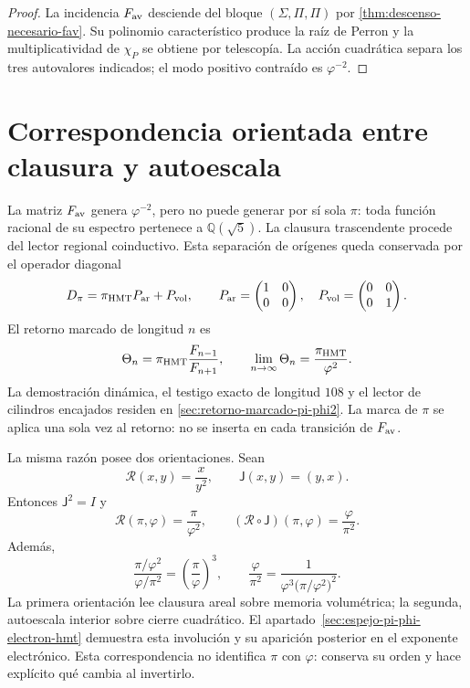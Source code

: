 \begin{proof}
La incidencia \(F_{\rm av}\) desciende del bloque
\((\Sigma,\Pi,\Pi)\) por
\cref{thm:descenso-necesario-fav}. Su polinomio característico produce la
raíz de Perron y la multiplicatividad de \(\chi_P\) se obtiene por
telescopía. La acción cuadrática separa los tres autovalores indicados; el
modo positivo contraído es \(\varphi^{-2}\).
\end{proof}

\section{Correspondencia orientada entre clausura y autoescala}

La matriz \(F_{\rm av}\) genera \(\varphi^{-2}\), pero no puede generar por
sí sola \(\pi\): toda función racional de su espectro pertenece a
\(\mathbb Q(\sqrt5)\). La clausura trascendente procede del lector regional
coinductivo. Esta separación de orígenes queda conservada por el operador
diagonal
\[
 D_\pi=\pi_{\rm HMT}P_{\rm ar}+P_{\rm vol},
\qquad
 P_{\rm ar}=
 \begin{pmatrix}1&0\\0&0\end{pmatrix},
\quad
 P_{\rm vol}=
 \begin{pmatrix}0&0\\0&1\end{pmatrix}.
\]
El retorno marcado de longitud \(n\) es
\[
\Theta_n
=\pi_{\rm HMT}\frac{F_{n-1}}{F_{n+1}},
\qquad
\lim_{n\to\infty}\Theta_n
=\frac{\pi_{\rm HMT}}{\varphi^2}.
\]
La demostración dinámica, el testigo exacto de longitud \(108\) y el lector
de cilindros encajados residen en
\cref{sec:retorno-marcado-pi-phi2}. La marca de \(\pi\) se aplica una sola
vez al retorno: no se inserta en cada transición de \(F_{\rm av}\).

La misma razón posee dos orientaciones. Sean
\[
\mathscr R(x,y)=\frac{x}{y^2},
\qquad
\mathsf J(x,y)=(y,x).
\]
Entonces \(\mathsf J^2=I\) y
\[
\boxed{
\mathscr R(\pi,\varphi)=\frac{\pi}{\varphi^2},
\qquad
(\mathscr R\circ\mathsf J)(\pi,\varphi)
=\frac{\varphi}{\pi^2}.}
\]
Además,
\[
\frac{\pi/\varphi^2}{\varphi/\pi^2}
={\left(\frac{\pi}{\varphi}\right)}^3,
\qquad
\frac{\varphi}{\pi^2}
=\frac{1}{\varphi^3{\bigl(\pi/\varphi^2\bigr)}^2}.
\]
La primera orientación lee clausura areal sobre memoria volumétrica; la
segunda, autoescala interior sobre cierre cuadrático. El
apartado~\ref{sec:espejo-pi-phi-electron-hmt} demuestra esta involución y su
aparición posterior en el exponente electrónico. Esta correspondencia no identifica
\(\pi\) con \(\varphi\): conserva su orden y hace explícito qué cambia al
invertirlo.

